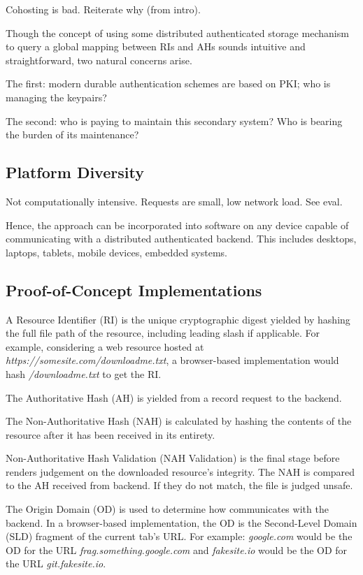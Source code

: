 Cohosting is bad. Reiterate why (from intro).

Though the concept of using some distributed authenticated storage mechanism to
query a global mapping between RIs and AHs sounds intuitive and straightforward,
two natural concerns arise.

The first: modern durable authentication schemes are based on PKI; who is
managing the keypairs?

The second: who is paying to maintain this secondary system? Who is bearing the
burden of its maintenance?

\subsection{Platform Diversity}

Not computationally intensive. Requests are small, low network load. See eval.

Hence, the approach can be incorporated into software on any device capable of
communicating with a distributed authenticated backend. This includes desktops,
laptops, tablets, mobile devices, embedded systems.

\subsection{Proof-of-Concept Implementations}

A Resource Identifier (RI) is the unique cryptographic digest yielded by hashing
the full file path of the resource, including leading slash if applicable. For
example, considering a web resource hosted at
\textit{https://somesite.com/downloadme.txt}, a browser-based \SYSTEM{}
implementation would hash \textit{/downloadme.txt} to get the RI.

The Authoritative Hash (AH) is yielded from a record request to the backend.

The Non-Authoritative Hash (NAH) is calculated by hashing the contents of the
resource after it has been received in its entirety.

Non-Authoritative Hash Validation (NAH Validation) is the final stage before
\SYSTEM{} renders judgement on the downloaded resource's integrity. The NAH is
compared to the AH received from backend. If they do not match, the file is
judged unsafe.

The Origin Domain (OD) is used to determine how \SYSTEM{} communicates with the
backend. In a browser-based implementation, the OD is the Second-Level Domain
(SLD) fragment of the current tab's URL. For example:
\emph{google.com} would be the OD for the URL \emph{frag.something.google.com}
and \emph{fakesite.io} would be the OD for the URL \emph{git.fakesite.io}.

